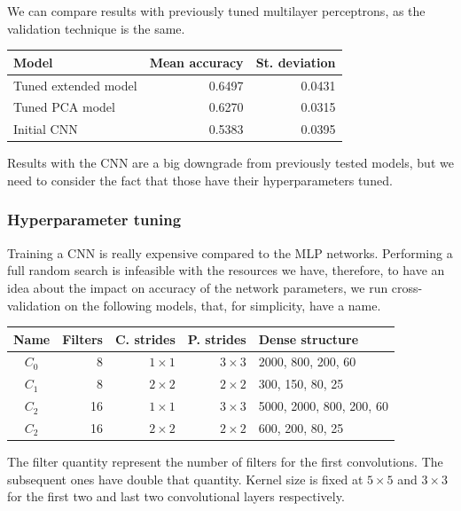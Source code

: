 We can compare results with previously tuned multilayer perceptrons, as the validation
technique is the same.
\begin{center}
    \begin{tabular}{ |l|r|r| } 
        \hline
        Model & Mean accuracy & St. deviation \\
        \hline
        Tuned extended model& 0.6497 & 0.0431 \\
        Tuned PCA model & 0.6270 & 0.0315 \\
        Initial CNN & 0.5383 & 0.0395 \\
        \hline
    \end{tabular}
\end{center}
Results with the CNN are a big downgrade from previously tested models, 
but we need to consider the fact that those have their 
hyperparameters tuned.

\subsubsection{Hyperparameter tuning}
Training a CNN is really expensive compared to the MLP networks.
Performing a full random search is infeasible with the resources we have, therefore, 
to have an idea about the impact on accuracy of the network parameters, we run 
cross-validation on the following models, that, for simplicity, have a name.
\begin{center}
    \begin{tabular}{ |c|r|r|r|l| } 
        \hline
        Name & Filters & C. strides & P. strides & Dense structure \\
        \hline
        $C_0$ & 8 &  $1 \times 1$ & $3 \times 3$ & 2000, 800, 200, 60 \\
        $C_1$ & 8 &  $2 \times 2$ & $2 \times 2$ & 300, 150, 80, 25 \\
        $C_2$ & 16 & $1 \times 1$ & $3 \times 3$ & 5000, 2000, 800, 200, 60 \\
        $C_2$ & 16 & $2 \times 2$ & $2 \times 2$ & 600, 200, 80, 25 \\
        \hline
    \end{tabular}
\end{center}

The filter quantity represent the number of filters for the first convolutions. 
The subsequent ones have double that quantity.
Kernel size is fixed at $5 \times 5$ and $3 \times 3$ for the first two and last 
two convolutional layers respectively. 

